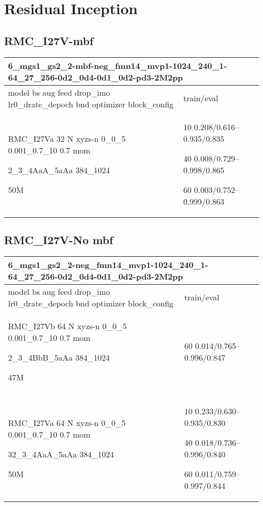 \documentclass[,table,dvipsnames]{article}
\begin{document}
\section{Residual Inception}
\subsection{RMC\_I27V-mbf}
\noindent\begin{tabular}{|p{10cm}|p{5cm}| }	
	\hline
	\multicolumn{2}{|p{15cm}|}{ 6\_mgs1\_gs2\_2-mbf-neg\_fmn14\_mvp1-1024\_240\_1-64\_27\_256-0d2\_0d4-0d1\_0d2-pd3-2M2pp }\\
	\hline
	model bs aug feed drop\_imo lr0\_drate\_depoch bnd optimizer block\_config & train/eval \\
	
	\rowcolor{red!20}
	RMC\_I27Va 32 N xyzs-n 0\_0\_5 0.001\_0.7\_10 0.7 mom\par 2\_3\_4AaA\_5aAa 384\_1024\par 50M& 
	10 0.208/0.616--0.935/0.835\par 40 0.008/0.729--0.998/0.865\par 60 0.003/0.752--0.999/0.863\\
	
	
	\hline 
\end{tabular}

\subsection{RMC\_I27V-No mbf}
\noindent\begin{tabular}{|p{10cm}|p{5cm}| }	
	\hline
	\multicolumn{2}{|p{15cm}|}{ 6\_mgs1\_gs2\_2-neg\_fmn14\_mvp1-1024\_240\_1-64\_27\_256-0d2\_0d4-0d1\_0d2-pd3-2M2pp }\\
	\hline
	model bs aug feed drop\_imo lr0\_drate\_depoch bnd optimizer block\_config & train/eval \\
	
	\rowcolor{red!20}
	RMC\_I27Vb 64 N xyzs-n 0\_0\_5 0.001\_0.7\_10 0.7 mom\par 2\_3\_4BbB\_5aAa 384\_1024\par 47M& 60 0.014/0.765--0.996/0.847\\
	
	\rowcolor{blue!20}\\
	RMC\_I27Va 64 N xyzs-n 0\_0\_5 0.001\_0.7\_10 0.7 mom\par 32\_3\_4AaA\_5aAa 384\_1024\par 50M & 10 0.233/0.630--0.935/0.830\par 40 0.018/0.736--0.996/0.840\par 60 0.011/0.759--0.997/0.844\\
	
	\hline 
\end{tabular}
\end{document}

